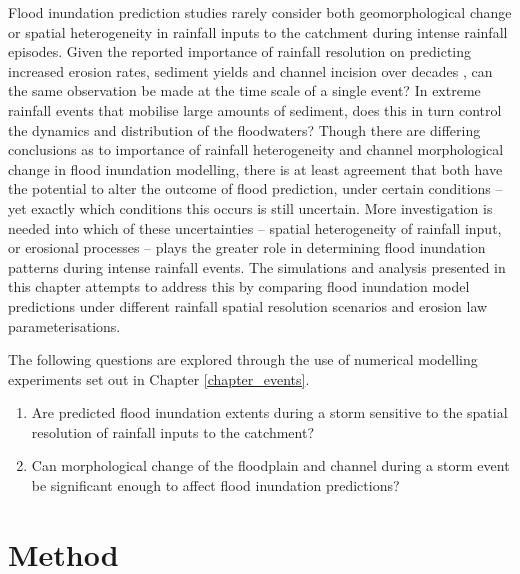 Flood inundation prediction studies rarely consider both geomorphological change or spatial heterogeneity in rainfall inputs to the catchment during intense rainfall episodes. Given the reported importance of rainfall resolution on predicting increased erosion rates, sediment yields and channel incision over decades \citep{deluis2010rainfall,coulthard2016sensitivity}, can the same observation be made at the time scale of a single event? In extreme rainfall events that mobilise large amounts of sediment, does this in turn control the dynamics and distribution of the floodwaters? Though there are differing conclusions as to importance of rainfall heterogeneity and channel morphological change in flood inundation modelling, there is at least agreement that both have the potential to alter the outcome of flood prediction, under certain conditions -- yet exactly which conditions this occurs  is still uncertain. More investigation is needed into which of these uncertainties -- spatial heterogeneity of rainfall input, or erosional processes -- plays the greater role in determining flood inundation patterns during intense rainfall events. The simulations and analysis presented in this chapter attempts to address this by comparing flood inundation model predictions under different rainfall spatial resolution scenarios and erosion law parameterisations. 


The following questions are explored through the use of numerical modelling experiments set out in Chapter \ref{chapter_events}.

\begin{enumerate}
\item Are predicted flood inundation extents during a storm sensitive to the spatial resolution of rainfall inputs to the catchment?
\item Can morphological change of the floodplain and channel during a storm event be significant enough to affect flood inundation predictions?
\end{enumerate}

\section{Method}

